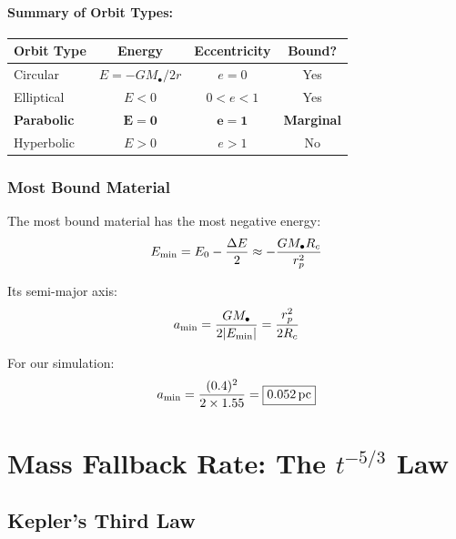 \documentclass[twocolumn,amsmath,amssymb,prd,superscriptaddress,nofootinbib]{revtex4-2}
\begin{document}
\paragraph{Summary of Orbit Types:}
\begin{center}
\begin{tabular}{lccc}
\toprule
Orbit Type & Energy & Eccentricity & Bound? \\
\midrule
Circular & $E = -GM_\bullet/2r$ & $e = 0$ & Yes \\
Elliptical & $E < 0$ & $0 < e < 1$ & Yes \\
\textbf{Parabolic} & $\mathbf{E = 0}$ & $\mathbf{e = 1}$ & \textbf{Marginal} \\
Hyperbolic & $E > 0$ & $e > 1$ & No \\
\bottomrule
\end{tabular}
\end{center}

\subsubsection{Most Bound Material}

The most bound material has the most negative energy:
\begin{equation}
    E_{\rm min} = E_0 - \frac{\Delta E}{2} \approx -\frac{GM_\bullet R_c}{r_p^2}
\end{equation}

Its semi-major axis:
\begin{equation}
    a_{\rm min} = \frac{GM_\bullet}{2|E_{\rm min}|} = \frac{r_p^2}{2R_c}
    \label{eq:a_min}
\end{equation}

For our simulation:
\begin{equation}
    a_{\rm min} = \frac{(0.4)^2}{2 \times 1.55} = \boxed{0.052\,{\rm pc}}
\end{equation}

\section{Mass Fallback Rate: The $t^{-5/3}$ Law}
\label{sec:fallback}

\subsection{Kepler's Third Law}
\label{sec:kepler}
\end{document}
